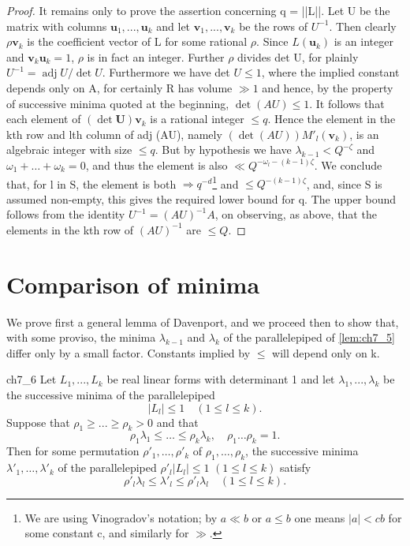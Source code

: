\begin{proof}
It remains only to prove the assertion concerning q = ||L||. Let U be the matrix with columns  $\mathbf{u}_1, ..., \mathbf{u}_k$  and let  $\mathbf{v}_1, ..., \mathbf{v}_k$  be the rows of  $U^{-1}$. Then clearly  $\rho \mathbf{v}_k$  is the coefficient vector of L for some rational  $\rho$. Since  $L(\mathbf{u}_k)$  is an integer and  $\mathbf{v}_k \mathbf{u}_k = 1$,  $\rho$  is in fact an integer. Further  $\rho$ divides det U, for plainly  $U^{-1} = \operatorname{adj} U/\operatorname{det} U$. Furthermore we have det  $U \leq 1$, where the implied constant depends only on A, for certainly R has volume  $\gg 1$  and hence, by the property of successive minima quoted at the beginning,  $\det(AU) \leqslant 1$. It follows that each element of  $(\det \mathbf{U}) \mathbf{v}_k$  is a rational integer  $\leqslant q$. Hence the element in the kth row and lth column of adj (AU), namely  $(\det(AU)) M'_{l}(\mathbf{v}_{k})$, is an algebraic integer with size  $\leq q$. But by hypothesis we have  $\lambda_{k-1} < Q^{-\zeta}$  and  $\omega_1 + \ldots + \omega_k = 0$, and thus the element is also  $\ll Q^{-\omega_l-(k-1)\zeta}$. We conclude that, for l in S, the element is both  $\Rightarrow q^{-d}$\footnote{We are using Vinogradov’s notation; by $a \ll b$ or $a \leqslant b$ one means $|a| < cb$ for some constant c, and similarly for $\gg$.} and  $\leqslant Q^{-(k-1)\zeta}$, and, since S is assumed non-empty, this gives the required lower bound for q. The upper bound follows from the identity  $U^{-1} = (AU)^{-1} A$, on observing, as above, that the elements in the kth row of  $(AU)^{-1}$  are  $\leqslant Q$.
\end{proof}

\section{Comparison of minima}\label{sec:ch7_8}

We prove first a general lemma of Davenport, and we proceed then to show that, with some proviso, the minima  $\lambda_{k-1}$  and  $\lambda_k$  of the parallelepiped of \autoref{lem:ch7_5} differ only by a small factor. Constants implied by  $\leqslant$  will depend only on k.

\begin{mylemma}{}{ch7_6}
Let  $L_1, ..., L_k$  be real linear forms with determinant 1 and let  $\lambda_1, ..., \lambda_k$  be the successive minima of the parallelepiped
\[|L_l| \leqslant 1 \quad (1 \leqslant l \leqslant k).\]
Suppose that  $\rho_1 \ge ... \ge \rho_k > 0$  and that
\[\rho_1 \lambda_1 \leqslant \ldots \leqslant \rho_k \lambda_k, \quad \rho_1 \ldots \rho_k = 1.\]
Then for some permutation  $\rho'_1, \ldots, \rho'_k$  of  $\rho_1, \ldots, \rho_k$, the successive minima  $\lambda'_1, \ldots, \lambda'_k$  of the parallelepiped  $\rho'_l | L_l | \leq 1$   $(1 \leq l \leq k)$  satisfy
\[\rho'_l \lambda_l \leqslant \lambda'_l \leqslant \rho'_l \lambda_l \quad (1 \leqslant l \leqslant k).\]
\end{mylemma}

